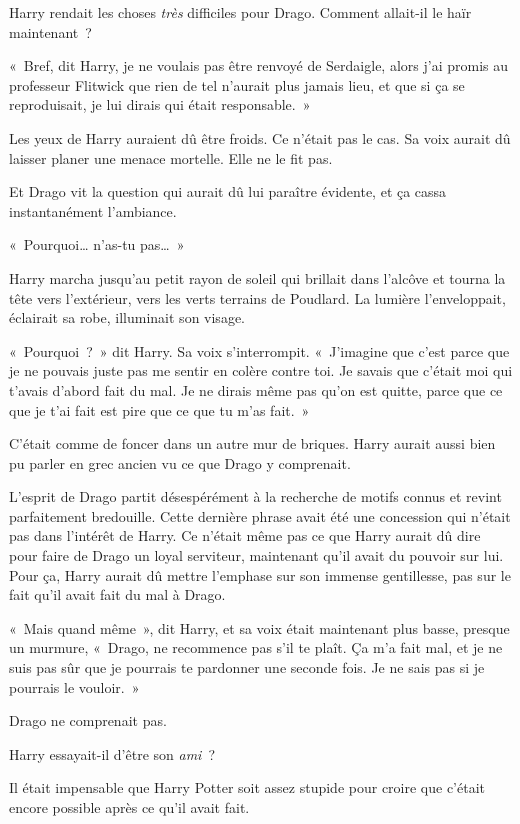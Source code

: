 Harry rendait les choses \emph{très} difficiles pour Drago.
Comment allait-il le haïr maintenant~?

«~Bref, dit Harry, je ne voulais pas être renvoyé de Serdaigle, alors j'ai promis au professeur Flitwick que rien de tel n'aurait plus jamais lieu, et que si ça se reproduisait, je lui dirais qui était responsable.~»

Les yeux de Harry auraient dû être froids.
Ce n'était pas le cas.
Sa voix aurait dû laisser planer une menace mortelle.
Elle ne le fit pas.

Et Drago vit la question qui aurait dû lui paraître évidente, et ça cassa instantanément l'ambiance.

«~Pourquoi… n'as-tu pas…~»

Harry marcha jusqu'au petit rayon de soleil qui brillait dans l'alcôve et tourna la tête vers l'extérieur, vers les verts terrains de Poudlard.
La lumière l'enveloppait, éclairait sa robe, illuminait son visage.

«~Pourquoi~?~»
dit Harry.
Sa voix s'interrompit.
«~J'imagine que c'est parce que je ne pouvais juste pas me sentir en colère contre toi.
Je savais que c'était moi qui t'avais d'abord fait du mal.
Je ne dirais même pas qu'on est quitte, parce que ce que je t'ai fait est pire que ce que tu m'as fait.~»

C'était comme de foncer dans un autre mur de briques.
Harry aurait aussi bien pu parler en grec ancien vu ce que Drago y comprenait.

L'esprit de Drago partit désespérément à la recherche de motifs connus et revint parfaitement bredouille.
Cette dernière phrase avait été une concession qui n'était pas dans l'intérêt de Harry.
Ce n'était même pas ce que Harry aurait dû dire pour faire de Drago un loyal serviteur, maintenant qu'il avait du pouvoir sur lui.
Pour ça, Harry aurait dû mettre l'emphase sur son immense gentillesse, pas sur le fait qu'il avait fait du mal à Drago.

«~Mais quand même~», dit Harry, et sa voix était maintenant plus basse, presque un murmure, «~Drago, ne recommence pas s'il te plaît.
Ça m'a fait mal, et je ne suis pas sûr que je pourrais te pardonner une seconde fois.
Je ne sais pas si je pourrais le vouloir.~»

Drago ne comprenait pas.

Harry essayait-il d'être son \emph{ami}~?

Il était impensable que Harry Potter soit assez stupide pour croire que c'était encore possible après ce qu'il avait fait.


